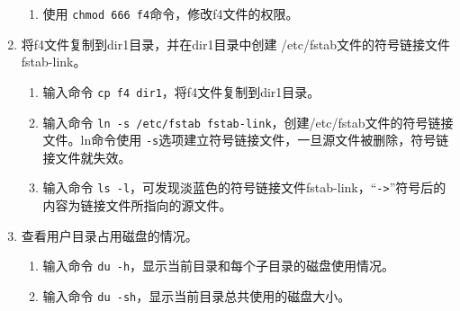 \begin{enumerate}
\begin{enumerate}
      \item 使用 \verb|chmod 666 f4|命令，修改f4文件的权限。
    \end{enumerate}
  \item 将f4文件复制到dir1目录，并在dir1目录中创建 /etc/fstab文件的符号链接文件fstab-link。
    \begin{enumerate}
      \item 输入命令 \verb|cp f4 dir1|，将f4文件复制到dir1目录。
      \item 输入命令 \verb|ln -s /etc/fstab fstab-link|，创建/etc/fstab文件的符号链接文件。ln命令使用 \verb|-s|选项建立符号链接文件，一旦源文件被删除，符号链接文件就失效。
      \item 输入命令 \verb|ls -l|，可发现淡蓝色的符号链接文件fstab-link，“\verb|->|”符号后的内容为链接文件所指向的源文件。
    \end{enumerate}
  \item 查看用户目录占用磁盘的情况。
    \begin{enumerate}
      \item 输入命令 \verb|du -h|，显示当前目录和每个子目录的磁盘使用情况。
      \item 输入命令 \verb|du -sh|，显示当前目录总共使用的磁盘大小。
    \end{enumerate}
\end{enumerate}

